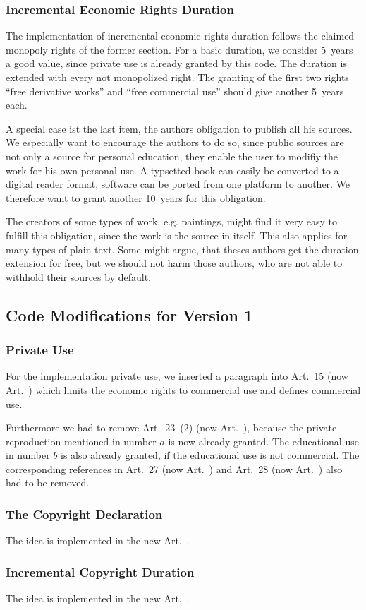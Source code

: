\subsubsection{Incremental Economic Rights Duration}

The implementation of incremental economic rights duration follows the claimed monopoly rights of the former section. For a basic duration, we consider 5~years a good value, since private use is already granted by this code. The duration is extended with every not monopolized right. The granting of the first two rights ``free derivative works'' and ``free commercial use'' should give another 5~years each.

A special case ist the last item, the authors obligation to publish all his sources. We especially want to encourage the authors to do so, since public sources are not only a source for personal education, they enable the user to modifiy the work for his own personal use. A typsetted book can easily be converted to a digital reader format, software can be ported from one platform to another. We therefore want to grant another 10~years for this obligation.

The creators of some types of work, e.g. paintings, might find it very easy to fulfill this obligation, since the work is the source in itself. This also applies for many types of plain text. Some might argue, that theses authors get the duration extension for free, but we should not harm those authors, who are not able to withhold their sources by default.

\subsection{Code Modifications for Version 1}

\subsubsection{Private Use}

For the implementation private use, we inserted a paragraph into Art.~15 (now Art.~) which limits the economic rights to commercial use and defines commercial use.

Furthermore we had to remove Art.~23~(2) (now Art.~), because the private reproduction mentioned in number $a$ is now already granted. The educational use in number $b$ is also already granted, if the educational use is not commercial. The corresponding references in Art.~27 (now Art.~) and Art.~28 (now Art.~) also had to be removed.

\subsubsection{The Copyright Declaration}

The idea is implemented in the new Art.~.

\subsubsection{Incremental Copyright Duration}

The idea is implemented in the new Art.~.


